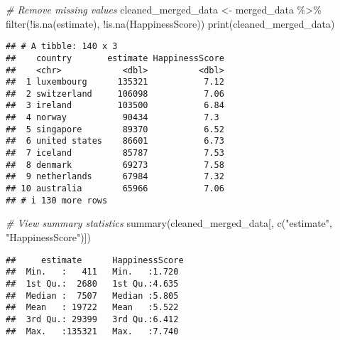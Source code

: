 \documentclass[
]{article}
\newenvironment{Shaded}{\begin{snugshade}}{\end{snugshade}}
\newcommand{\CommentTok}[1]{\textcolor[rgb]{0.56,0.35,0.01}{\textit{#1}}}
\newcommand{\FunctionTok}[1]{\textcolor[rgb]{0.00,0.00,0.00}{#1}}
\newcommand{\NormalTok}[1]{#1}
\newcommand{\OtherTok}[1]{\textcolor[rgb]{0.56,0.35,0.01}{#1}}
\newcommand{\SpecialCharTok}[1]{\textcolor[rgb]{0.00,0.00,0.00}{#1}}
\newcommand{\StringTok}[1]{\textcolor[rgb]{0.31,0.60,0.02}{#1}}
\begin{document}
\begin{Shaded}
\begin{Highlighting}[]
\CommentTok{\# Remove missing values}
\NormalTok{cleaned\_merged\_data }\OtherTok{\textless{}{-}}\NormalTok{ merged\_data }\SpecialCharTok{\%\textgreater{}\%}
  \FunctionTok{filter}\NormalTok{(}\SpecialCharTok{!}\FunctionTok{is.na}\NormalTok{(estimate), }\SpecialCharTok{!}\FunctionTok{is.na}\NormalTok{(HappinessScore))}
\FunctionTok{print}\NormalTok{(cleaned\_merged\_data)}
\end{Highlighting}
\end{Shaded}

\begin{verbatim}
## # A tibble: 140 x 3
##    country       estimate HappinessScore
##    <chr>            <dbl>          <dbl>
##  1 luxembourg      135321           7.12
##  2 switzerland     106098           7.06
##  3 ireland         103500           6.84
##  4 norway           90434           7.3 
##  5 singapore        89370           6.52
##  6 united states    86601           6.73
##  7 iceland          85787           7.53
##  8 denmark          69273           7.58
##  9 netherlands      67984           7.32
## 10 australia        65966           7.06
## # i 130 more rows
\end{verbatim}

\begin{Shaded}
\begin{Highlighting}[]
\CommentTok{\# View summary statistics }
\FunctionTok{summary}\NormalTok{(cleaned\_merged\_data[, }\FunctionTok{c}\NormalTok{(}\StringTok{"estimate"}\NormalTok{, }\StringTok{"HappinessScore"}\NormalTok{)])}
\end{Highlighting}
\end{Shaded}

\begin{verbatim}
##     estimate      HappinessScore 
##  Min.   :   411   Min.   :1.720  
##  1st Qu.:  2680   1st Qu.:4.635  
##  Median :  7507   Median :5.805  
##  Mean   : 19722   Mean   :5.522  
##  3rd Qu.: 29399   3rd Qu.:6.412  
##  Max.   :135321   Max.   :7.740
\end{verbatim}
\end{document}
